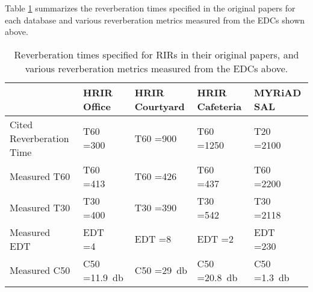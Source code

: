 Table \ref{table:rir_reverb_times} summarizes the reverberation times  specified in the original papers for each database and various reverberation metrics measured from the EDCs shown above.

\begin{table}[H]
	\begin{tabular}{ |p{}||p{}|p{}|p{}|p{}|  }
		\hline
		 & HRIR \newline Office & HRIR \newline Courtyard & HRIR \newline Cafeteria & MYRiAD \newline SAL \\
		\hline
		\hline
		 Cited \newline Reverberation Time  & 
		 T60 =\newline \qty{300}{\milli\sec}  & 
		 T60 =\newline \qty{900}{\milli\sec} &  
		 T60 =\newline \qty{1250}{\milli\sec} & 
		 T20 =\newline \qty{2100}{\milli\sec} \\	 
		 \hline
		 Measured T60  & 
		T60 =\newline \qty{413}{\milli\sec}  & 
		T60 =\newline \qty{426}{\milli\sec} &  
		T60 =\newline \qty{437}{\milli\sec} & 
		T60 =\newline \qty{2200}{\milli\sec} \\	 
		\hline
		Measured T30  & 
		T30 =\newline \qty{400}{\milli\sec}  & 
		T30 =\newline \qty{390}{\milli\sec} &  
		T30 =\newline \qty{542}{\milli\sec} & 
		T30 =\newline \qty{2118}{\milli\sec} \\	 
		\hline
		Measured EDT  & 
		EDT =\newline \qty{4}{\milli\sec}  & 
		EDT =\newline \qty{8}{\milli\sec} &  
		EDT =\newline \qty{2}{\milli\sec} & 
		EDT =\newline \qty{230}{\milli\sec} \\	 
		\hline
		Measured C50  & 
		C50 =\newline \qty{11.9}{\decibel}  & 
		C50 =\newline \qty{29}{\decibel}&  
		C50 =\newline \qty{20.8}{\decibel}& 
		C50 =\newline \qty{1.3}{\decibel}\\	 
		\hline
	\end{tabular}
	\caption{Reverberation times specified for RIRs in their original papers, and various reverberation metrics measured from the EDCs above.}
	\label{table:rir_reverb_times}
\end{table}

